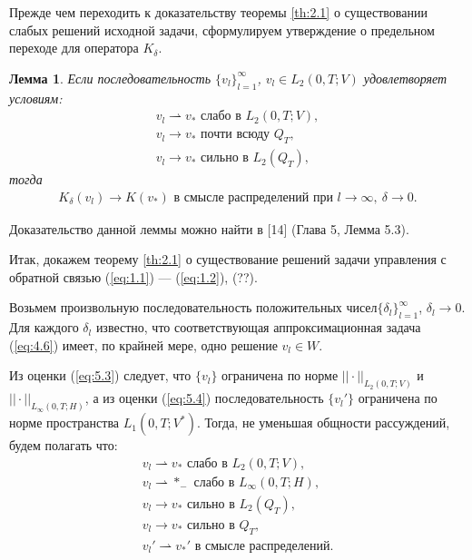 \documentclass[14pt, a4paper]{extarticle}
\newtheorem{lemma}{Лемма}[section]
\numberwithin{equation}{section}
\begin{document}
    Прежде чем переходить к доказательству теоремы \ref{th:2.1} о существовании слабых решений
    исходной задачи, сформулируем утверждение о предельном переходе для оператора $K_\delta$.
    \begin{lemma}\label{lm:6.1}
        Если последовательность $\{ v_l \}_{l=1}^\infty$, $v_l \in L_2(0,T;V)$ удовлетворяет условиям:
        \begin{equation*}
            \begin{gathered}
                v_l \rightharpoonup v_* \textrm{ слабо в } L_2(0,T;V),\\
                v_l \rightarrow v_* \textrm{ почти всюду } Q_T,\\
                v_l \rightarrow v_* \textrm{ сильно в } L_2(Q_T),
            \end{gathered}
        \end{equation*}
        \noindent тогда
        \begin{equation*}
            \begin{gathered}
                K_\delta(v_l) \rightarrow K(v_*) \textrm{ в смысле распределений при } l \rightarrow \infty, \ \delta \rightarrow 0.
            \end{gathered}
        \end{equation*}
    \end{lemma}

    Доказательство данной леммы можно найти в [14] (Глава 5, Лемма 5.3).

    Итак, докажем теорему \ref{th:2.1} о существование решений задачи управления с обратной связью (\ref{eq:1.1}) --- (\ref{eq:1.2}), (??).

    Возьмем произвольную последовательность положительных чисел\linebreak$\{ \delta_l \}_{l=1}^\infty$, $\delta_l \rightarrow 0$.
    Для каждого $\delta_l$ известно, что соответствующая аппроксимационная задача (\ref{eq:4.6}) имеет,
    по крайней мере, одно решение $v_l \in W$. 

    Из оценки (\ref{eq:5.3}) следует, что $\{ v_l \}$ ограничена по норме $||\cdot||_{L_2(0,T;V)}$ и
    $||\cdot||_{L_\infty(0,T;H)}$, а из  оценки (\ref{eq:5.4}) последовательность $\{ v_l' \}$
    ограничена по норме пространства $L_1(0,T;V^*)$.
    Тогда, не уменьшая общности рассуждений, будем полагать что:
    \begin{equation*}
        \begin{gathered}
            v_l \rightharpoonup v_* \textrm{ слабо в } L_2(0,T;V),\\
            v_l \rightharpoonup *_- \textrm{ слабо в } L_\infty(0,T;H),\\
            v_l \rightarrow v_* \textrm{ сильно в } L_2(Q_T),\\
            v_l \rightarrow v_* \textrm{ сильно в } Q_T,\\
            v_l' \rightharpoonup v_*' \textrm{ в смысле распределений.}
        \end{gathered}
    \end{equation*}
\end{document}
